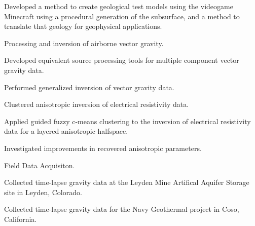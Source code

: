 \begin{cventries}
{      \begin{cvitems}
        \item {Developed a method to create geological test models using the videogame Minecraft using a procedural generation of the subsurface, and a method to translate that geology for geophysical applications.}
        \vspace{10pt}
      \end{cvitems}
      \begin{cvparagraph}
      \vspace{7pt}
      Processing and inversion of airborne vector gravity.
      \vspace{7pt}
      \end{cvparagraph}
      \begin{cvitems}
        \item {Developed equivalent source processing tools for multiple component vector gravity data.}
        \item {Performed generalized inversion of vector gravity data.}
        \vspace{10pt}
      \end{cvitems}
      \begin{cvparagraph}
      \vspace{7pt}
      Clustered anisotropic inversion of electrical resistivity data.
      \vspace{7pt}
      \end{cvparagraph}
      \begin{cvitems}
        \item {Applied guided fuzzy c-means clustering to the inversion of electrical resistivity data for a layered anisotropic halfspace.}
        \item{Investigated improvements in recovered anisotropic parameters.}
        \vspace{10pt}
      \end{cvitems}
      \begin{cvparagraph}
      \vspace{7pt}
      Field Data Acquisiton.
      \vspace{7pt}
      \end{cvparagraph}
      \begin{cvitems}
        \item {Collected time-lapse gravity data at the Leyden Mine Artifical Aquifer Storage site in Leyden, Colorado.}
        \item{Collected time-lapse gravity data for the Navy Geothermal project in Coso, California.}

\end{cvitems}}
\end{cventries}
